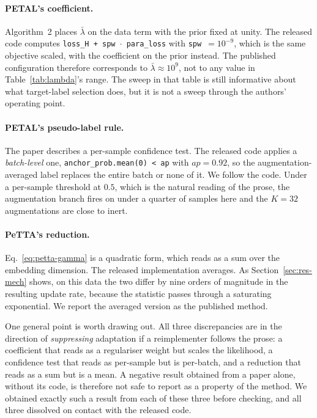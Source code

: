 \documentclass[a4paper,fleqn]{cas-dc}
\begin{document}
\paragraph{PETAL's coefficient.} Algorithm~2 places $\bar\lambda$ on the data term with the
prior fixed at unity. The released code computes
\texttt{loss\_H + spw\,$\cdot$\,para\_loss} with \texttt{spw}~$=10^{-9}$, which is the same
objective scaled, with the coefficient on the prior instead. The published configuration
therefore corresponds to $\bar\lambda\approx10^{9}$, not to any value in
Table~\ref{tab:lambda}'s range. The sweep in that table is still informative about what
target-label selection does, but it is not a sweep through the authors' operating point.

\paragraph{PETAL's pseudo-label rule.} The paper describes a per-sample confidence test. The
released code applies a \emph{batch-level} one, \texttt{anchor\_prob.mean(0) < ap} with
$\textit{ap}=0.92$, so the augmentation-averaged label replaces the entire batch or none of
it. We follow the code. Under a per-sample threshold at $0.5$, which is the natural reading
of the prose, the augmentation branch fires on under a quarter of samples here and the
$K=32$ augmentations are close to inert.

\paragraph{PeTTA's reduction.} Eq.~\ref{eq:petta-gamma} is a quadratic form, which reads as
a sum over the embedding dimension. The released implementation averages. As
Section~\ref{sec:res-mech} shows, on this data the two differ by nine orders of magnitude
in the resulting update rate, because the statistic passes through a saturating
exponential. We report the averaged version as the published method.

One general point is worth drawing out. All three discrepancies are in the direction of
\emph{suppressing} adaptation if a reimplementer follows the prose: a coefficient that
reads as a regulariser weight but scales the likelihood, a confidence test that reads as
per-sample but is per-batch, and a reduction that reads as a sum but is a mean. A negative
result obtained from a paper alone, without its code, is therefore not safe to report as a
property of the method. We obtained exactly such a result from each of these three before
checking, and all three dissolved on contact with the released code.
\end{document}
